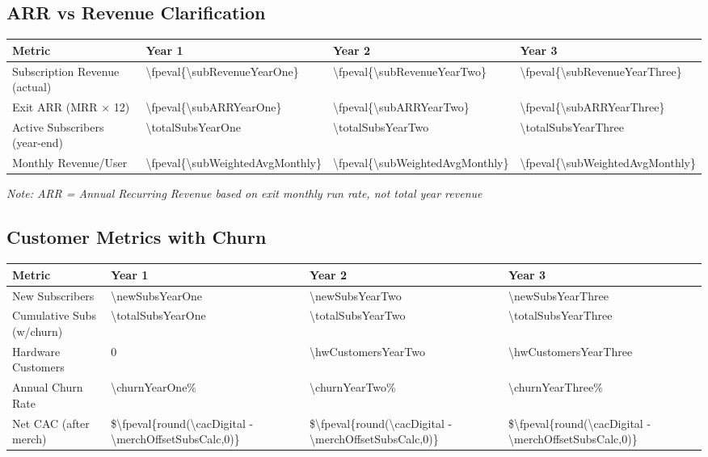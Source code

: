 \documentclass[11pt]{article}
\newcommand{\numfpeval}[1]{\num{\fpeval{#1}}}
\begin{document}
\subsection{ARR vs Revenue Clarification}
\begin{table}[H]
\centering
\begin{tabularx}{\linewidth}{l Y Y Y}
\toprule
Metric & Year 1 & Year 2 & Year 3 \\\midrule
Subscription Revenue (actual) & \numfpeval{\subRevenueYearOne} & \numfpeval{\subRevenueYearTwo} & \numfpeval{\subRevenueYearThree} \\
Exit ARR (MRR $\times$ 12) & \numfpeval{\subARRYearOne} & \numfpeval{\subARRYearTwo} & \numfpeval{\subARRYearThree} \\
Active Subscribers (year-end) & \num{\totalSubsYearOne} & \num{\totalSubsYearTwo} & \num{\totalSubsYearThree} \\
Monthly Revenue/User & \numfpeval{\subWeightedAvgMonthly} & \numfpeval{\subWeightedAvgMonthly} & \numfpeval{\subWeightedAvgMonthly} \\
\bottomrule
\end{tabularx}
\end{table}
\textit{Note: ARR = Annual Recurring Revenue based on exit monthly run rate, not total year revenue}

\subsection{Customer Metrics with Churn}
\begin{table}[H]
\centering
\begin{tabularx}{\linewidth}{l Y Y Y}
\toprule
Metric & Year 1 & Year 2 & Year 3 \\\midrule
New Subscribers & \num{\newSubsYearOne} & \num{\newSubsYearTwo} & \num{\newSubsYearThree} \\
Cumulative Subs (w/churn) & \num{\totalSubsYearOne} & \num{\totalSubsYearTwo} & \num{\totalSubsYearThree} \\
Hardware Customers & \num{0} & \num{\hwCustomersYearTwo} & \num{\hwCustomersYearThree} \\
Annual Churn Rate\cite{recurly2024} & \num{\churnYearOne}\% & \num{\churnYearTwo}\% & \num{\churnYearThree}\% \\
Net CAC (after merch) & \$\numfpeval{round(\cacDigital - \merchOffsetSubsCalc,0)} & \$\numfpeval{round(\cacDigital - \merchOffsetSubsCalc,0)} & \$\numfpeval{round(\cacDigital - \merchOffsetSubsCalc,0)} \\
\bottomrule
\end{tabularx}
\end{table}
\end{document}
